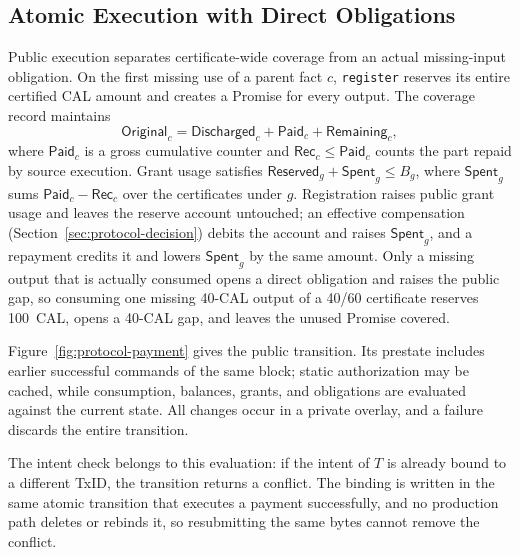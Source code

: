 \subsection{Atomic Execution with Direct Obligations}
\label{sec:protocol-execution}

Public execution separates certificate-wide coverage from an actual missing-input obligation. On the first missing use of a parent fact $c$, \texttt{register} reserves its entire certified CAL amount and creates a Promise for every output. The coverage record maintains
\begin{equation}
  \mathsf{Original}_c=
  \mathsf{Discharged}_c+\mathsf{Paid}_c+\mathsf{Remaining}_c,
  \label{eq:protocol-coverage}
\end{equation}
where $\mathsf{Paid}_c$ is a gross cumulative counter and $\mathsf{Rec}_c\le\mathsf{Paid}_c$ counts the part repaid by source execution. Grant usage satisfies $\mathsf{Reserved}_g+\mathsf{Spent}_g\le B_g$, where $\mathsf{Spent}_g$ sums $\mathsf{Paid}_c-\mathsf{Rec}_c$ over the certificates under $g$. Registration raises public grant usage and leaves the reserve account untouched; an effective compensation (Section~\ref{sec:protocol-decision}) debits the account and raises $\mathsf{Spent}_g$, and a repayment credits it and lowers $\mathsf{Spent}_g$ by the same amount. Only a missing output that is actually consumed opens a direct obligation and raises the public gap, so consuming one missing 40-CAL output of a 40/60 certificate reserves 100~CAL, opens a 40-CAL gap, and leaves the unused Promise covered.

Figure~\ref{fig:protocol-payment} gives the public transition. Its prestate includes earlier successful commands of the same block; static authorization may be cached, while consumption, balances, grants, and obligations are evaluated against the current state. All changes occur in a private overlay, and a failure discards the entire transition.

The intent check belongs to this evaluation: if the intent of $T$ is already bound to a different TxID, the transition returns a conflict. The binding is written in the same atomic transition that executes a payment successfully, and no production path deletes or rebinds it, so resubmitting the same bytes cannot remove the conflict.


